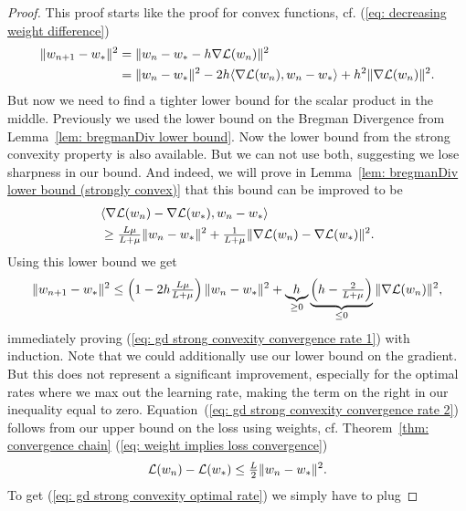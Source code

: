 \begin{proof}
	This proof starts like the proof for convex functions, cf. (\ref{eq:
	decreasing weight difference})
 \begin{align*}
		\|w_{n+1} - w_*\|^2
		&= \| w_n -w_* - h\nabla\mathcal{L}(w_n)\|^2\\
		&= \| w_n - w_*\|^2
		- 2h\langle \nabla\mathcal{L}(w_n), w_n - w_*\rangle
		+ h^2 \| \nabla\mathcal{L}(w_n)\|^2.
	\end{align*}
	But now we need to find a tighter lower bound for the scalar product in the
	middle. Previously we used the lower bound on the Bregman Divergence from
	Lemma~\ref{lem: bregmanDiv lower bound}. Now the lower bound
	from the strong convexity property is also available. But we can not use
	both, suggesting we lose sharpness in our bound. And indeed, we will prove in
	Lemma~\ref{lem: bregmanDiv lower bound (strongly convex)} that this bound can
	be improved to be
 	\begin{align*}
		&\langle \nabla\mathcal{L}(w_n) -\nabla\mathcal{L}(w_*), w_n - w_*\rangle	\\
		&\ge \tfrac{L\mu}{L+\mu}\|w_n - w_*\|^2
		+ \tfrac{1}{L+\mu}
		\|\nabla\mathcal{L}(w_n) - \nabla\mathcal{L}(w_*)\|^2.
	\end{align*}
	Using this lower bound we get
 \begin{align*}
		\|w_{n+1} - w_*\|^2
		\le \left(1- 2h \tfrac{L\mu}{L+\mu}\right)
		\|w_n - w_*\|^2
		+ \underbrace{h}_{\ge 0}
		\underbrace{\left(h-\tfrac{2}{L+\mu}\right)}_{\le0}
		\|\nabla\mathcal{L}(w_n)\|^2,
	\end{align*}
	immediately proving (\ref{eq: gd strong convexity convergence rate
	1}) with induction. Note that we could additionally use our lower bound on the
	gradient. But this does not represent a significant improvement,
	especially for the optimal rates where we max out the learning rate, making
	the term on the right in our inequality equal to zero. Equation~(\ref{eq: gd
	strong convexity convergence rate 2}) follows from our upper bound on the
	loss using weights, cf. Theorem~\ref{thm: convergence chain} (\ref{eq: weight
	implies loss convergence})
	\begin{align*}
		\mathcal{L}(w_n) - \mathcal{L}(w_*)
		\le \tfrac{L}{2} \| w_n - w_*\|^2.
	\end{align*}
	To get (\ref{eq: gd strong convexity optimal rate}) we simply have to plug

\end{proof}
